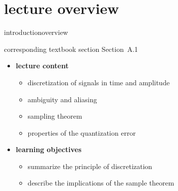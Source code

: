 


\subtitle{Module A.1: Fundamentals~---~Digitization}


	

    \section[overview]{lecture overview}
        \begin{frame}{introduction}{overview}
            \begin{block}{corresponding textbook section}
                    Section~A.1
            \end{block}

            \begin{itemize}
                \item   \textbf{lecture content}
                    \begin{itemize}
                        \item   discretization of signals in time and amplitude
                        \item   ambiguity and aliasing
                        \item   sampling theorem
                        \item   properties of the quantization error
                    \end{itemize}
                \bigskip
                \item<2->   \textbf{learning objectives}
                    \begin{itemize}
                        \item   summarize the principle of discretization
                        \item   describe the implications of the sample theorem
                    \end{itemize}
            \end{itemize}
        \end{frame}
        
